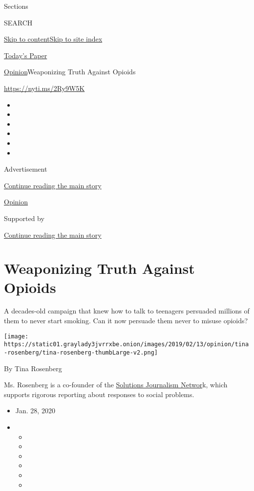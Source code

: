 Sections

SEARCH

\protect\hyperlink{site-content}{Skip to
content}\protect\hyperlink{site-index}{Skip to site index}

\href{https://myaccount.nytimes3xbfgragh.onion/auth/login?response_type=cookie\&client_id=vi}{}

\href{https://www.nytimes3xbfgragh.onion/section/todayspaper}{Today's
Paper}

\href{/section/opinion}{Opinion}\textbar{}Weaponizing Truth Against
Opioids

\url{https://nyti.ms/2Ry9W5K}

\begin{itemize}
\item
\item
\item
\item
\item
\item
\end{itemize}

Advertisement

\protect\hyperlink{after-top}{Continue reading the main story}

\href{/section/opinion}{Opinion}

Supported by

\protect\hyperlink{after-sponsor}{Continue reading the main story}

\hypertarget{weaponizing-truth-against-opioids}{%
\section{Weaponizing Truth Against
Opioids}\label{weaponizing-truth-against-opioids}}

A decades-old campaign that knew how to talk to teenagers persuaded
millions of them to never start smoking. Can it now persuade them never
to misuse opioids?

\texttt{[image: https://static01.graylady3jvrrxbe.onion/images/2019/02/13/opinion/tina-rosenberg/tina-rosenberg-thumbLarge-v2.png]}

By Tina Rosenberg

Ms. Rosenberg is a co-founder of the
\href{http://solutionsjournalism.org}{Solutions Journalism Networ}k,
which supports rigorous reporting about responses to social problems.

\begin{itemize}
\item
  Jan. 28, 2020
\item
  \begin{itemize}
  \item
  \item
  \item
  \item
  \item
  \item
  \end{itemize}
\end{itemize}

